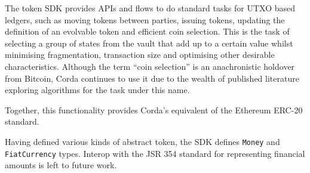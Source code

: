 \documentclass{article}
\begin{document}
The token SDK provides APIs and flows to do standard tasks for UTXO based ledgers, such as moving tokens between
parties, issuing tokens, updating the definition of an evolvable token and efficient coin selection. This is the
task of selecting a group of states from the vault that add up to a certain value whilst minimising fragmentation,
transaction size and optimising other desirable characteristics. Although the term ``coin selection'' is an
anachronistic holdover from Bitcoin, Corda continues to use it due to the wealth of published literature exploring
algorithms for the task under this name.

Together, this functionality provides Corda's equivalent of the Ethereum ERC-20 standard\cite{ERC20}.

Having defined various kinds of abstract token, the SDK defines \texttt{Money} and \texttt{FiatCurrency} types.
Interop with the JSR 354 standard for representing financial amounts is left to future work.
\end{document}
